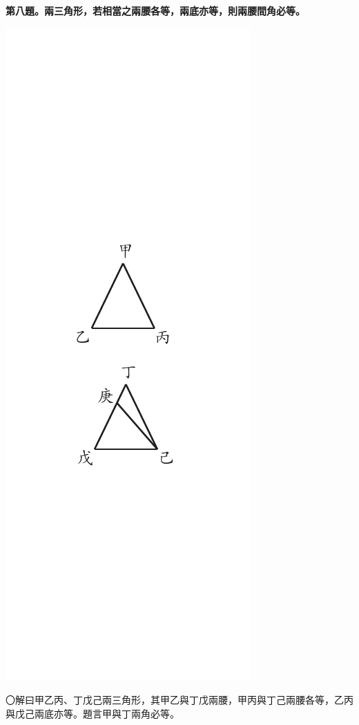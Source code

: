 \documentclass[12pt,b5paper,landscape]{article}
\newcommand{\bcom}[1]{〇#1}
\newcommand{\cthm}[1]{{
\vspace{8pt}

\bfseries #1}}
\begin{document}
\begin{multicols}{2}
\cthm{第八題。兩三角形，若相當之兩腰各等，兩底亦等，則兩腰間角必等。}
\begin{center}
\includegraphics[angle=90]{eu44}
\end{center}
\bcom{解曰甲乙丙、丁戊己兩三角形，其甲乙與丁戊兩腰，甲丙與丁己兩腰各等，乙丙與戊己兩底亦等。題言甲與丁兩角必等。}
\begin{center}

\end{center}
\end{multicols}
\end{document}

